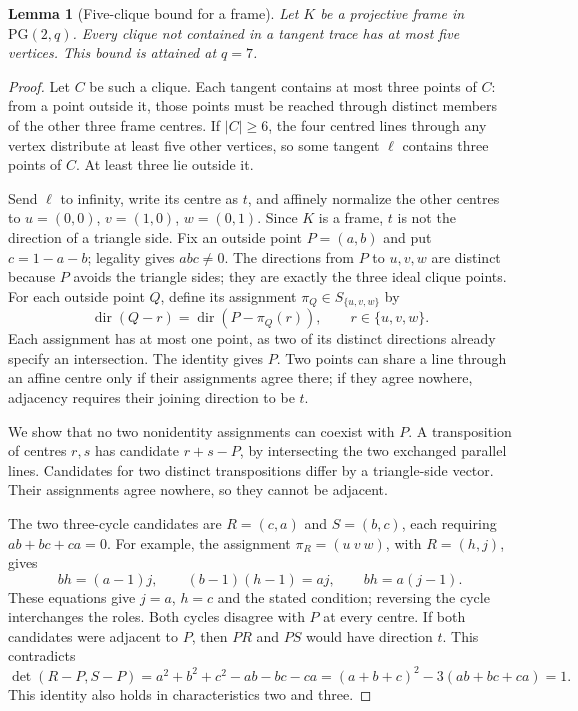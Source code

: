 \documentclass[11pt]{article}
\newtheorem{lemma}[theorem]{Lemma}
\theoremstyle{definition}
\theoremstyle{remark}
\newcommand{\PG}{\mathrm{PG}}
\begin{document}
\begin{lemma}[Five-clique bound for a frame]\label{lem:frame-clique}
Let $K$ be a projective frame in $\PG(2,q)$. Every clique not contained
in a tangent trace has at most five vertices. This bound is attained at $q=7$.
\end{lemma}
\begin{proof}
Let $C$ be such a clique. Each tangent contains at most three points of
$C$: from a point outside it, those points must be reached through distinct
members of the other three frame centres. If $|C|\ge6$, the four centred
lines through any vertex distribute at least five other vertices, so some
tangent $\ell$ contains three points of $C$. At least three lie outside it.

Send $\ell$ to infinity, write its centre as $t$, and affinely normalize
the other centres to $u=(0,0)$, $v=(1,0)$, $w=(0,1)$.
Since $K$ is a frame, $t$ is not the direction of a triangle side.
Fix an outside point $P=(a,b)$ and put $c=1-a-b$; legality gives $abc\ne0$.
The directions from $P$ to $u,v,w$ are distinct because $P$ avoids
the triangle sides; they are exactly the three ideal clique points.
For each outside point $Q$, define its assignment $\pi_Q\in S_{\{u,v,w\}}$ by
\[
 \operatorname{dir}(Q-r)=\operatorname{dir}(P-\pi_Q(r)),
 \qquad r\in\{u,v,w\}.
\] Each assignment has at most one point,
as two of its distinct directions already specify an intersection.
The identity gives $P$. Two points can share a line through an affine
centre only if their assignments agree there; if they agree nowhere,
adjacency requires their joining direction to be $t$.

We show that no two nonidentity assignments can coexist with $P$.
A transposition of centres $r,s$ has candidate $r+s-P$, by intersecting
the two exchanged parallel lines. Candidates for two distinct
transpositions differ by a triangle-side vector. Their assignments agree
nowhere, so they cannot be adjacent.

The two three-cycle candidates are $R=(c,a)$ and $S=(b,c)$, each requiring
$ab+bc+ca=0$. For example, the assignment $\pi_R=(u\ v\ w)$, with $R=(h,j)$, gives
\[
 bh=(a-1)j,\qquad (b-1)(h-1)=aj,\qquad bh=a(j-1).
\]
These equations give $j=a$, $h=c$ and the stated condition; reversing
the cycle interchanges the roles. Both cycles disagree with $P$ at every
centre. If both candidates were adjacent to $P$, then $PR$ and $PS$
would have direction $t$. This contradicts
\[
 \det(R-P,S-P)=a^2+b^2+c^2-ab-bc-ca
             =(a+b+c)^2-3(ab+bc+ca)=1.
\]
This identity also holds in characteristics two and three.


\end{proof}
\end{document}
